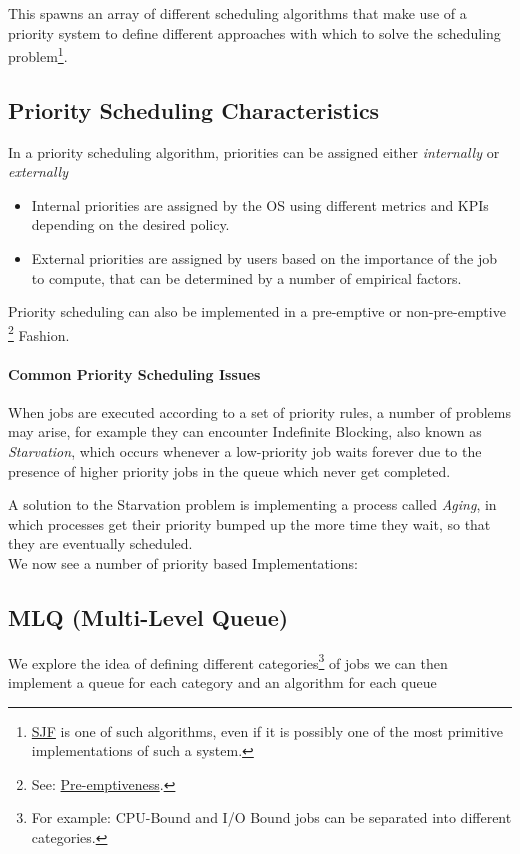 \documentclass[openright, twoside]{report}
\theoremstyle{definition}
\theoremstyle{example}
\begin{document}
		This spawns an array of different scheduling algorithms that make use of a
		priority system to define different approaches with which to solve the scheduling 
		problem\footnote{\hyperref[ssec:SJF]{SJF} is one of such algorithms, even if it is 
		possibly one of the most primitive implementations of such a system.}.
				
		\subsection{Priority Scheduling Characteristics}
		In a priority scheduling algorithm, priorities can be assigned either 
		\emph{internally} or \emph{externally}

		\begin{itemize}
			\item Internal priorities are assigned by the OS using different metrics and 
			KPIs depending on the desired policy.
			\item External priorities are assigned by users based on the importance of the
			job to compute, that can be determined by a number of empirical factors.
		\end{itemize}

		Priority scheduling can also be implemented in a pre-emptive or non-pre-emptive
		\footnote{See: \hyperref[par:preem]{Pre-emptiveness}.} Fashion.

		\paragraph{Common Priority Scheduling Issues}
		When jobs are executed according to a set of priority rules, a number of problems
		may arise, for example they can encounter Indefinite Blocking, also known as 
		\emph{Starvation}, which occurs whenever a low-priority job waits forever due to 
		the presence of higher priority jobs in the queue which never get completed.

		A solution to the Starvation problem is implementing a process called \emph{Aging},
		in which processes get their priority bumped up the more time they wait, so that 
		they are eventually scheduled. \\ 

		We now see a number of priority based Implementations:


	
	\subsection{MLQ (Multi-Level Queue)}
	\label{ssec:MLQ}
	We explore the idea of defining different categories\footnote{For example: CPU-Bound
	and I/O Bound jobs can be separated into different categories.} of jobs we can then implement
	a queue for each category and an algorithm for each queue
\end{document}
